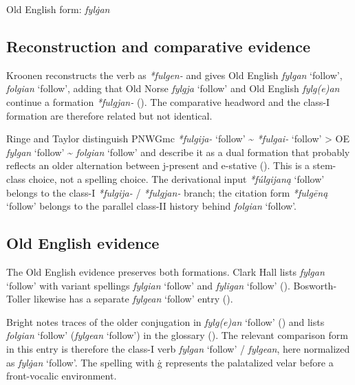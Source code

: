 \documentclass[
  british,
  a4paper,
  openany]{book}
\providecommand{\Recon}[1]{\emph{*#1}}
{\catcode`→=\active \global\def→{\ensuremath{\rightarrow}}}
\providecommand{\Recon}[1]{\emph{*#1}}
{\catcode`→=\active \global\def→{\ensuremath{\rightarrow}}}
\begin{document}
Old English form: \emph{fylġan}

\subsection{Reconstruction and comparative
evidence}\label{reconstruction-and-comparative-evidence-81}

Kroonen reconstructs the verb as \emph{*fulgen-} and gives Old English
{\emph{fylgan}} `follow', {\emph{folgian}} `follow', adding that Old
Norse {\emph{fylgja}} `follow' and Old English {\emph{fylg(e)an}}
continue a formation \emph{*fulgjan-}
(). The comparative
headword and the class-I formation are therefore related but not
identical.

Ringe and Taylor distinguish PNWGmc \Recon{fulgija-} `follow'
\textasciitilde{} \Recon{fulgai-} `follow' \textgreater{} OE
{\emph{fylgan}} `follow' \textasciitilde{} {\emph{folgian}} `follow' and
describe it as a dual formation that probably reflects an older
alternation between j-present and e-stative
(). This
is a stem-class choice, not a spelling choice. The derivational input
{\Recon{fúlgijaną} `follow'} belongs to the class-I \emph{*fulgija-} /
\emph{*fulgjan-} branch; the citation form {\Recon{fulgēną} `follow'}
belongs to the parallel class-II history behind {\emph{folgian}}
`follow'.

\subsection{Old English evidence}\label{old-english-evidence-81}

The Old English evidence preserves both formations. Clark Hall lists
{\emph{fylgan}} `follow' with variant spellings {\emph{fylgian}}
`follow' and {\emph{fyligan}} `follow'
(). Bosworth-Toller
likewise has a separate {\emph{fylgean}} `follow' entry
().

Bright notes traces of the older conjugation in {\emph{fylg(e)an}}
`follow' () and
lists {\emph{folgian}} `follow' ({\emph{fylgean}} `follow') in the
glossary ().
The relevant comparison form in this entry is therefore the class-I verb
{\emph{fylgan}} `follow' / {\emph{fylgean}}, here normalized as
{\emph{fylġan}} `follow'. The spelling with ġ represents the palatalized
velar before a front-vocalic environment.
\end{document}
